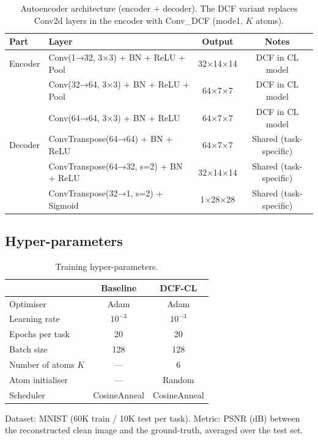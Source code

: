 \documentclass[11pt,letterpaper]{article}
\begin{document}
\begin{table}[h]
\centering
\caption{Autoencoder architecture (encoder + decoder). The DCF variant
replaces Conv2d layers in the encoder with Conv\_DCF (mode1, $K$ atoms).}
\label{tab:arch}
\begin{tabular}{llcc}
\toprule
Part & Layer & Output & Notes \\
\midrule
Encoder & Conv(1→32, 3×3) + BN + ReLU + Pool & 32×14×14 & DCF in CL model \\
        & Conv(32→64, 3×3) + BN + ReLU + Pool & 64×7×7 & DCF in CL model \\
        & Conv(64→64, 3×3) + BN + ReLU         & 64×7×7 & DCF in CL model \\
\midrule
Decoder & ConvTranspose(64→64) + BN + ReLU    & 64×7×7 & Shared (task-specific) \\
        & ConvTranspose(64→32, s=2) + BN + ReLU & 32×14×14 & Shared (task-specific) \\
        & ConvTranspose(32→1, s=2) + Sigmoid     & 1×28×28  & Shared (task-specific) \\
\bottomrule
\end{tabular}
\end{table}

\subsection{Hyper-parameters}

\begin{table}[h]
\centering
\caption{Training hyper-parameters.}
\label{tab:hp}
\begin{tabular}{lcc}
\toprule
 & Baseline & DCF-CL \\
\midrule
Optimiser & Adam & Adam \\
Learning rate & $10^{-3}$ & $10^{-3}$ \\
Epochs per task & 20 & 20 \\
Batch size & 128 & 128 \\
Number of atoms $K$ & — & 6 \\
Atom initialiser & — & Random \\
Scheduler & CosineAnneal & CosineAnneal \\
\bottomrule
\end{tabular}
\end{table}

Dataset: MNIST (60K train / 10K test per task).
Metric: PSNR (dB) between the reconstructed clean image and the
ground-truth, averaged over the test set.
\end{document}
